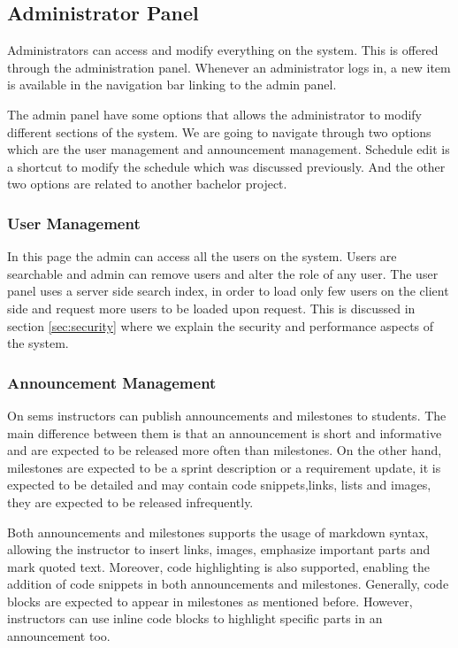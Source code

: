 \subsection{Administrator Panel}
\label{sub:admin-panel}
Administrators can access and modify everything on the system. This is offered through the administration panel. Whenever an administrator logs in,
a new item is available in the navigation bar linking to the admin panel.

\newParagraph
The admin panel have some options that allows the administrator to modify different sections of the system. We are going
to navigate through two options which are the user management and announcement management. Schedule edit is a shortcut to modify
the schedule which was discussed previously. And the other two options are related to another bachelor project.

\subsubsection{User Management}
\label{subs:admin-users}
In this page the admin can access all the users on the system. Users are searchable and admin can remove users and alter
the role of any user. The user panel uses a server side search index, in order to load only few users on the client side and request more
users to be loaded upon request. This is discussed in section \ref{sec:security} where we explain the security and performance aspects of the system.

\subsubsection{Announcement Management}
\label{subs:announcement-management}
On \ac{sems} instructors can publish announcements and milestones to students. The main difference between them
is that an announcement is short and informative and are expected to be released more often than milestones.
On the other hand, milestones are expected to be a sprint description or a requirement update,
it is expected to be detailed and may contain code snippets,links, lists and images, they are expected to be released infrequently.

\newParagraph
Both announcements and milestones supports the usage of markdown syntax, allowing the instructor to insert links, images, emphasize important
parts and mark quoted text. Moreover, code highlighting is also supported, enabling the addition of code snippets in both announcements and milestones. Generally,
code blocks are expected to appear in milestones as mentioned before. However, instructors can use inline code blocks to highlight specific parts
in an announcement too.

